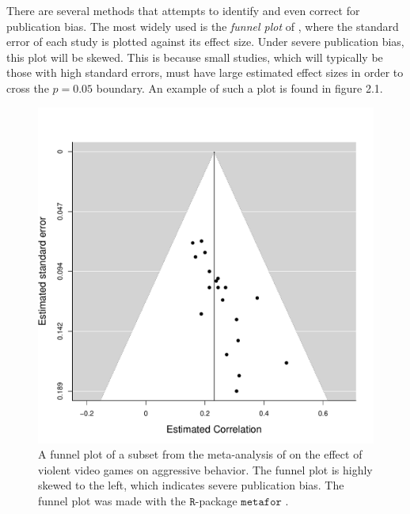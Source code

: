 There are several methods that attempts to identify and even correct
for publication bias. The most widely used is the \emph{funnel plot}
of \cite{Egger1998-kj}, where the standard error of each study
is plotted against its effect size. Under severe publication bias,
this plot will be skewed. This is because small studies, which will
typically be those with high standard errors, must have large estimated
effect sizes in order to cross the $p=0.05$ boundary. An example
of such a plot is found in figure 2.1.

\begin{figure}
\noindent \begin{centering}
\includegraphics[scale=0.5]{chunks/anderson}
\par\end{centering}
\caption{\label{fig:A-funnel-plot}A funnel plot of a subset from the meta-analysis
of \cite{Anderson2010-ki} on the effect of violent video games
on aggressive behavior. The funnel plot is highly skewed to the left,
which indicates severe publication bias. The funnel plot was made
with the $\mathtt{R}$-package \cite{team_r_2000}
$\mathtt{metafor}$ \parencite{viechtbauer_conducting_2010}.}
\end{figure}

